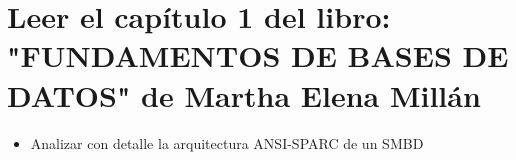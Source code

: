 \documentclass[letterpaper,12pt]{article}
\begin{document}
\begin{sloppypar}
\section*{Leer el capítulo 1 del libro: "FUNDAMENTOS DE BASES DE DATOS" de Martha Elena Millán}
\begin{itemize}
    \item Analizar con detalle la arquitectura ANSI-SPARC de un SMBD
\end{itemize}


\end{sloppypar}
\end{document}
